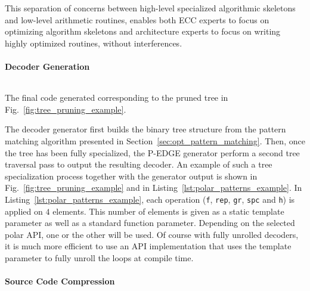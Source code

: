 This separation of concerns between high-level specialized algorithmic skeletons
and low-level arithmetic routines, enables both ECC experts to focus on
optimizing algorithm skeletons and architecture experts to focus on writing
highly optimized routines, without interferences.

\paragraph{Decoder Generation}

\begin{listing}[htp]
  \inputminted[frame=lines,linenos]{C++}{main/chapter3/src/polar/generated_sc_decoder.cpp}
  \caption{The final code generated corresponding to the pruned tree in
    Fig.~\ref{fig:tree_pruning_example}.}
  \label{lst:polar_patterns_example}
\end{listing}

The decoder generator first builds the binary tree structure from the pattern
matching algorithm presented in Section~\ref{sec:opt_pattern_matching}. Then,
once the tree has been fully specialized, the P-EDGE generator perform a second
tree traversal pass to output the resulting decoder. An example of such a tree
specialization process together with the generator output is shown in
Fig.~\ref{fig:tree_pruning_example} and in
Listing~\ref{lst:polar_patterns_example}. In
Listing~\ref{lst:polar_patterns_example}, each operation (\verb|f|, \verb|rep|,
\verb|gr|, \verb|spc| and \verb|h|) is applied on $4$ elements. This number
of elements is given as a static template parameter as well as a standard
function parameter. Depending on the selected polar API, one or the other will
be used. Of course with fully unrolled decoders, it is much more efficient to
use an API implementation that uses the template parameter to fully unroll the
loops at compile time.

\paragraph{Source Code Compression}

